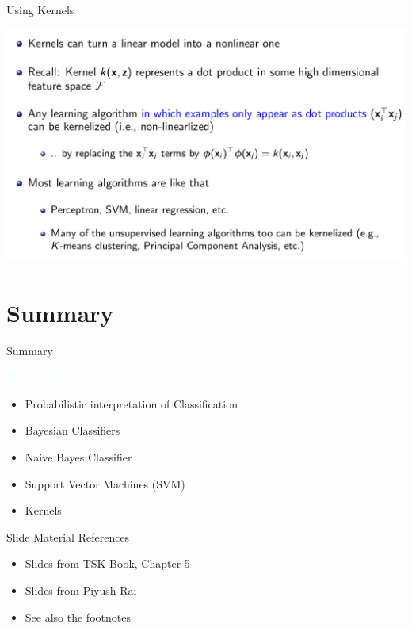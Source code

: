 \documentclass{beamer}
\newcommand{\tblue}[1]{{\Large {\textcolor{azure}{#1}}}}
\begin{document}
\begin{frame}{Using Kernels}
    \begin{center}
        \includegraphics[scale=0.32]{kernels8.png}
    \end{center}
\end{frame}


\section{Summary}
\begin{frame}{Summary}

\tblue{Major Concepts:}
\begin{itemize}
    \item Probabilistic interpretation of Classification
    \item Bayesian Classifiers
    \item Naive Bayes Classifier
    \item Support Vector Machines (SVM)
    \item Kernels
\end{itemize}
\end{frame}

\begin{frame}{Slide Material References}
\begin{itemize}
    \item Slides from TSK Book, Chapter 5 
    \item Slides from Piyush Rai 
    \item See also the footnotes
\end{itemize}
\end{frame}
\end{document}
